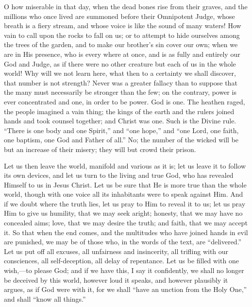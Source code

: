 O how miserable in that day, when the dead bones rise from their
graves, and the millions who once lived are summoned before their
Omnipotent Judge, whose breath is a fiery stream, and whose voice is
like the sound of many waters! How vain to call upon the rocks to fall
on us; or to attempt to hide ourselves among the trees of the garden,
and to make our brother's sin cover our own; when we are in His
presence, who is every where at once, and is as fully and entirely our
God and Judge, as if there were no other creature but each of us in
the whole world! Why will we not learn here, what then to a certainty
we shall discover, that number is not strength? Never was a greater
fallacy than to suppose that the many must necessarily be stronger
than the few; on the contrary, power is ever concentrated and one, in
order to be power. God is one. The heathen raged, the people imagined
a vain thing; the kings of the earth and the rulers joined hands and
took counsel together; and Christ was one. Such is the Divine rule.
``There is one body and one Spirit,'' and ``one
hope,'' and ``one Lord, one faith, one baptism, one God and
Father of all.'' No; the number of the wicked will be but an
increase of their misery; they will but crowd their prison.

Let us then leave the world, manifold and various as it is; let us
leave it to follow its own devices, and let us turn to the living and
true God, who has revealed Himself to us in Jesus Christ. Let us be
sure that He is more true than the whole world, though with one voice
all its inhabitants were to speak against Him. And if we doubt where
the truth lies, let us pray to Him to reveal it to us; let us pray Him
to give us humility, that we may seek aright; honesty, that we may
have no concealed aims; love, that we may desire the truth; and faith,
that we may accept it. So that when the end comes, and the multitudes
who have joined hands in evil are punished, we may be of those who, in
the words of the text, are ``delivered.'' Let us put off all
excuses, all unfairness and insincerity, all trifling with our
consciences, all self-deception, all delay of repentance. Let us be
filled with one wish,—to please God; and if we have this, I say it
confidently, we shall no longer be deceived by this world, however
loud it speaks, and however plausibly it argues, as if God were with
it, for we shall ``have an unction from the Holy One,'' and
shall ``know all things.''


